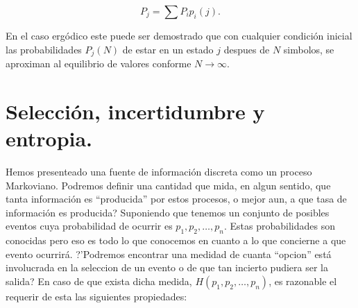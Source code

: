 \begin{equation}
P_{j} = \sum P_{i}p_{i}(j).
\end{equation}

En el caso erg\'{o}dico este puede ser demostrado que con cualquier
condici\'{o}n inicial las probabilidades $P_{j}(N)$ de estar en un
estado $j$ despues de $N$ simbolos, se aproximan al equilibrio de
valores conforme $N \rightarrow \infty$.

\clearpage

\section{Selecci\'{o}n, incertidumbre y entropia.}

Hemos presenteado una fuente de informaci\'{o}n discreta como un
proceso Markoviano. Podremos definir una cantidad que mida, en algun
sentido, que tanta informaci\'{o}n es ``producida'' por estos
procesos, o mejor aun, a que tasa de informaci\'{o}n es producida?
Suponiendo que tenemos un conjunto de posibles eventos cuya
probabilidad de ocurrir es $p_{1}, p_{2}, \ldots, p_{n}$. Estas
probabilidades son conocidas pero eso es todo lo que conocemos en
cuanto a lo que concierne a que evento ocurrir\'{a}. ?'Podremos
encontrar una medidad de cuanta ``opcion'' est\'{a} involucrada en la
seleccion de un evento o de que tan incierto pudiera ser la salida?
En caso de que exista dicha medida, $H(p_{1}, p_{2}, \ldots, p_{n})$,
es razonable el requerir de esta las siguientes propiedades:

